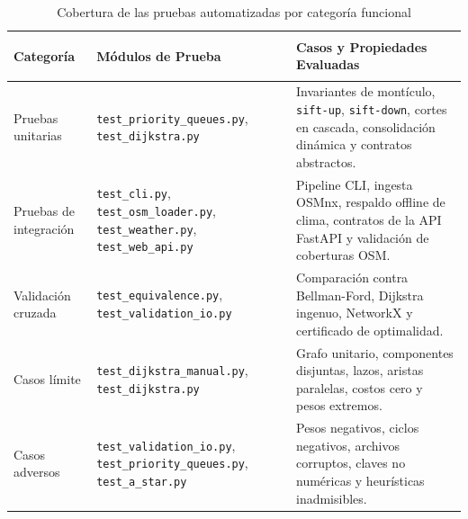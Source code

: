 \begin{table}[H]
    \centering
    \fontsize{9}{11}\selectfont
    \renewcommand{\arraystretch}{1.15}
    \caption{Cobertura de las pruebas automatizadas por categoría funcional}
    \label{tab:categorias_prueba}
    \begin{tabularx}{\textwidth}{@{}>{\bfseries\raggedright\arraybackslash}p{3.0cm} >{\raggedright\arraybackslash}p{4.0cm} X@{}}
        \toprule
        \textbf{Categoría} & \textbf{Módulos de Prueba} & \textbf{Casos y Propiedades Evaluadas} \\
        \midrule
        Pruebas unitarias & \texttt{test\_priority\_queues.py}, \texttt{test\_dijkstra.py} & Invariantes de montículo, \texttt{sift-up}, \texttt{sift-down}, cortes en cascada, consolidación dinámica y contratos abstractos. \\
        Pruebas de integración & \texttt{test\_cli.py}, \texttt{test\_osm\_loader.py}, \texttt{test\_weather.py}, \texttt{test\_web\_api.py} & Pipeline CLI, ingesta OSMnx, respaldo offline de clima, contratos de la API FastAPI y validación de coberturas OSM. \\
        Validación cruzada & \texttt{test\_equivalence.py}, \texttt{test\_validation\_io.py} & Comparación contra Bellman-Ford, Dijkstra ingenuo, NetworkX y certificado de optimalidad. \\
        Casos límite & \texttt{test\_dijkstra\_manual.py}, \texttt{test\_dijkstra.py} & Grafo unitario, componentes disjuntas, lazos, aristas paralelas, costos cero y pesos extremos. \\
        Casos adversos & \texttt{test\_validation\_io.py}, \texttt{test\_priority\_queues.py}, \texttt{test\_a\_star.py} & Pesos negativos, ciclos negativos, archivos corruptos, claves no numéricas y heurísticas inadmisibles. \\
        \bottomrule
    \end{tabularx}
\end{table}

